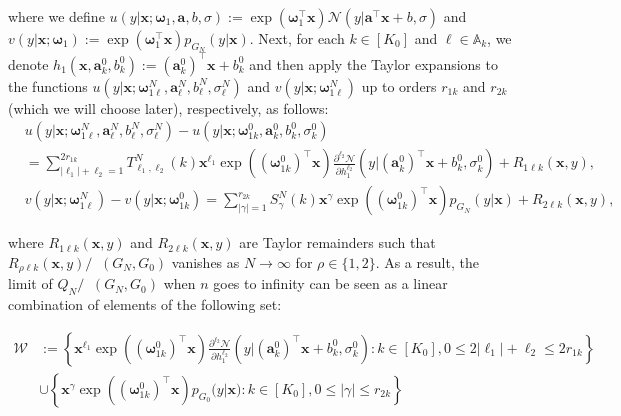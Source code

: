 \documentclass[twoside]{article}
\DeclareMathOperator*{\VDFRA}{D_{FRA}}
\theoremstyle{plain}
\theoremstyle{definition}
\theoremstyle{plain}
\def\vomega{{\bm{\omega}}}
\def\va{{\bm{a}}}
\def\vx{{\bm{x}}}
\def\sA{{\mathbb{A}}}
\newcommand{\cN}{\mathcal{N}}
\begin{document}
where we define $u\left(y|\vx ; \vomega_{1}, \va, b, \sigma\right):=\exp \left(\vomega_{1}^{\top} \vx\right) \cN\left(y| \va^{\top} \vx+b, \sigma\right)$ and $v\left(y|\vx ; \vomega_{1}\right):= \exp \left(\vomega_{1}^{\top} \vx\right) p_{G_{N}}(y|\vx)$. Next, for each $k \in\left[K_0\right]$ and $\ell \in \sA_k$, we denote $h_{1}\left(\vx, \va_{k}^{0}, b_{k}^{0}\right):=\left(\va_{k}^{0}\right)^{\top} \vx+b_{k}^{0}$ and then apply the Taylor expansions to the functions $u\left(y|\vx ; \vomega_{1 \ell}^N, \va_{\ell}^N, b_{\ell}^N, \sigma_{\ell}^N\right)$ and $v\left(y|\vx ; \vomega_{1 \ell}^N\right)$ up to orders $r_{1 k}$ and $r_{2 k}$ (which we will choose later), respectively, as follows:
\begin{align*}
& u\left(y|\vx ; \vomega_{1 \ell}^N, \va_{\ell}^N, b_{\ell}^N, \sigma_{\ell}^N\right)-u\left(y|\vx ; \vomega_{1k}^{0}, \va_{k}^{0}, b_{k}^{0}, \sigma_{k}^{0}\right) \\
& =\sum_{\left|\ell_{1}\right|+\ell_{2}=1}^{2 r_{1 k}} T_{\ell_{1}, \ell_{2}}^N(k) \vx^{\ell_{1}} \exp \left((\vomega_{1k}^{0})^{\top} \vx\right) \frac{\partial^{\ell_{2}} \cN}{\partial h_{1}^{\ell_{2}}}\left(y|\left(\va_{k}^{0}\right)^{\top} \vx+b_{k}^{0}, \sigma_{k}^{0}\right)+R_{1 \ell k}(\vx, y), \\
& v\left(y|\vx ; \vomega_{1 \ell}^N\right)-v\left(y|\vx ; \vomega_{1k}^{0}\right)=\sum_{|\gamma|=1}^{r_{2 k}} S_{\gamma}^N(k) \vx^{\gamma} \exp \left(\left(\vomega_{1k}^{0}\right)^{\top} \vx\right) p_{G_{N}}(y|\vx)+R_{2 \ell k}(\vx, y),
\end{align*}

where $R_{1 \ell k}(\vx, y)$ and $R_{2 \ell k}(\vx, y)$ are Taylor remainders such that $R_{\rho \ell k}(\vx, y) / \VDFRA\left(G_{N}, G_{0}\right)$ vanishes as $N \rightarrow \infty$ for $\rho \in\{1,2\}$. As a result, the limit of $Q_{N} / \VDFRA\left(G_{N}, G_{0}\right)$ when $n$ goes to infinity can be seen as a linear combination of elements of the following set:

$$
\begin{aligned}
\mathcal{W} & :=\left\{\vx^{\ell_{1}} \exp \left(\left(\vomega_{1k}^{0}\right)^{\top} \vx\right) \frac{\partial^{\ell_{2}} \cN}{\partial h_{1}^{\ell_{2}}}\left(y|\left(\va_{k}^{0}\right)^{\top} \vx+b_{k}^{0}, \sigma_{k}^{0}\right): k \in\left[K_0\right], 0 \leq 2\left|\ell_{1}\right|+\ell_{2} \leq 2 r_{1 k}\right\} \\
& \cup\left\{\vx^{\gamma} \exp \left((\vomega_{1k}^{0})^{\top} \vx\right) p_{G_{0}}(y|\vx): k \in\left[K_0\right], 0 \leq|\gamma| \leq r_{2 k}\right\}
\end{aligned}
$$
\end{document}
